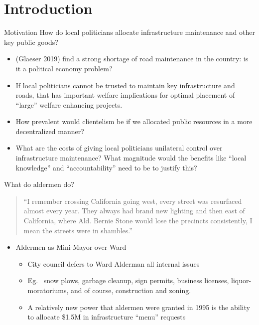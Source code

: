 \section{Introduction}

\begin{frame}{Motivation}
    How do local politicians allocate infrastructure maintenance and other key public goods?
    \begin{itemize}
        \item (Glaeser 2019) find a strong shortage of road maintenance in the country: is it a political economy problem?
        \item If local politicians cannot be trusted to maintain key infrastructure and roads, that has important welfare implications for optimal placement of ``large'' welfare enhancing projects.
        \item How prevalent would clientelism be if we allocated public resources in a more decentralized manner?
        \item What are the costs of giving local politicians unilateral control over infrastructure maintenance? What magnitude would the benefits like ``local knowledge'' and ``accountability'' need to be to justify this?
    \end{itemize}
\end{frame}
    
\begin{frame}{What do aldermen do?}
    \begin{center}
    \begin{quotation}
        ``I remember crossing California going west, every street was resurfaced almost every year. They always had brand new lighting and then east of California, where Ald. Bernie Stone would lose the precincts consistently, I mean the streets were in shambles.'' \\
    \end{quotation}
    \end{center}
    \begin{itemize}
        \item Aldermen as Mini-Mayor over Ward
        \begin{itemize}
            \item City council defers to Ward Alderman all internal issues
            \item Eg. \ snow plows, garbage cleanup, sign permits, business licenses, liquor-moratoriums, and of course, construction and zoning.
            \item A relatively new power that aldermen were granted in 1995 is the ability to allocate \$1.5M in infrastructure ``menu'' requests 
        \end{itemize}
    \end{itemize}
\end{frame}
    
